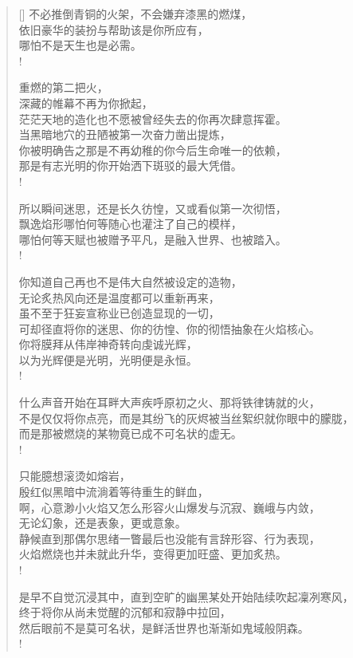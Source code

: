 \documentclass[UTF8, 12pt, a4paper]{ctexrep} %
\begin{document}
\begin{verse}[\versewidth]
不必推倒青铜的火架，不会嫌弃漆黑的燃煤，\\
依旧豪华的装扮与帮助该是你所应有，\\
哪怕不是天生也是必需。\\!

重燃的第二把火，\\
深藏的帷幕不再为你掀起，\\
茫茫天地的造化也不愿被曾经失去的你再次肆意挥霍。\\
当黑暗地穴的丑陋被第一次奋力凿出提炼，\\
你被明确告之那是不再幼稚的你今后生命唯一的依赖，\\
那是有志光明的你开始洒下斑驳的最大凭借。\\!

所以瞬间迷思，还是长久彷惶，又或看似第一次彻悟，\\
飘逸焰形哪怕何等随心也灌注了自己的模样，\\
哪怕何等天赋也被赠予平凡，是融入世界、也被踏入。\\!

你知道自己再也不是伟大自然被设定的造物，\\
无论炙热风向还是温度都可以重新再来，\\
虽不至于狂妄宣称业已创造显现的一切，\\
可却径直将你的迷思、你的彷惶、你的彻悟抽象在火焰核心。\\
你将膜拜从伟岸神奇转向虔诚光辉，\\
以为光辉便是光明，光明便是永恒。\\!

什么声音开始在耳畔大声疾呼原初之火、那将铁律铸就的火，\\
不是仅仅将你点亮，而是其纷飞的灰烬被当丝絮织就你眼中的朦胧，\\
而是那被燃烧的某物竟已成不可名状的虚无。\\!

只能臆想滚烫如熔岩，\\
殷红似黑暗中流淌着等待重生的鲜血，\\
啊，心意渺小火焰又怎么形容火山爆发与沉寂、巍峨与内敛，\\
无论幻象，还是表象，更或意象。\\
静候直到那偶尔思绪一瞥最后也没能有言辞形容、行为表现，\\
火焰燃烧也并未就此升华，变得更加旺盛、更加炙热。\\!

是早不自觉沉浸其中，直到空旷的幽黑某处开始陆续吹起凜冽寒风，\\
终于将你从尚未觉醒的沉郁和寂静中拉回，\\
然后眼前不是莫可名状，是鲜活世界也渐渐如鬼域般阴森。\\!


\end{verse}
\end{document}
